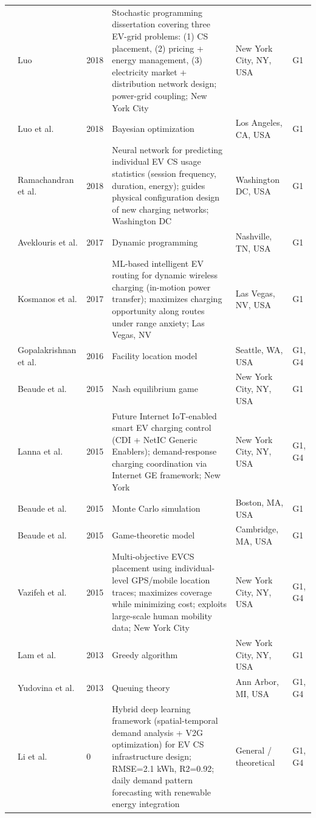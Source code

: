 \documentclass[letterpaper, 12pt, oneside, doublespacing]{Thesis}
\begin{document}
\begin{longtable}{L{0.9cm} L{2.2cm} L{0.8cm} L{3.3cm} L{2.5cm} L{1.5cm}}
\cite{engineering_and_2018} & Luo & 2018 & Stochastic programming dissertation covering three EV-grid problems: (1) CS placement, (2) pricing + energy management, (3) electricity market + distribution network design; power-grid coupling; New York City & New York City, NY, USA & G1 \\
\cite{placement_of_2018} & Luo et al. & 2018 & Bayesian optimization & Los Angeles, CA, USA & G1 \\
\cite{predicting_electric_2018} & Ramachandran et al. & 2018 & Neural network for predicting individual EV CS usage statistics (session frequency, duration, energy); guides physical configuration design of new charging networks; Washington DC & Washington DC, USA & G1 \\
\cite{electric_vehicle_2017} & Aveklouris et al. & 2017 & Dynamic programming & Nashville, TN, USA & G1 \\
\cite{route_optimization_2017} & Kosmanos et al. & 2017 & ML-based intelligent EV routing for dynamic wireless charging (in-motion power transfer); maximizes charging opportunity along routes under range anxiety; Las Vegas, NV & Las Vegas, NV, USA & G1 \\
\cite{demand_prediction_2016} & Gopalakrishnan et al. & 2016 & Facility location model & Seattle, WA, USA & G1, G4 \\
\cite{charging_games_2015} & Beaude et al. & 2015 & Nash equilibrium game & New York City, NY, USA & G1 \\
\cite{electric_vehicles_2015} & Lanna et al. & 2015 & Future Internet IoT-enabled smart EV charging control (CDI + NetIC Generic Enablers); demand-response charging coordination via Internet GE framework; New York & New York City, NY, USA & G1, G4 \\
\cite{introducing_decentralized_2015} & Beaude et al. & 2015 & Monte Carlo simulation & Boston, MA, USA & G1 \\
\cite{minimizing_the_2015} & Beaude et al. & 2015 & Game-theoretic model & Cambridge, MA, USA & G1 \\
\cite{optimizing_the_2015} & Vazifeh et al. & 2015 & Multi-objective EVCS placement using individual-level GPS/mobile location traces; maximizes coverage while minimizing cost; exploits large-scale human mobility data; New York City & New York City, NY, USA & G1, G4 \\
\cite{electric_vehicle_2013} & Lam et al. & 2013 & Greedy algorithm & New York City, NY, USA & G1 \\
\cite{socially_optimal_2013} & Yudovina et al. & 2013 & Queuing theory & Ann Arbor, MI, USA & G1, G4 \\
\cite{electric_vehicle_0} & Li et al. & 0 & Hybrid deep learning framework (spatial-temporal demand analysis + V2G optimization) for EV CS infrastructure design; RMSE=2.1 kWh, R2=0.92; daily demand pattern forecasting with renewable energy integration & General {\slash} theoretical & G1, G4 \\
\bottomrule
\end{longtable}
\end{document}
